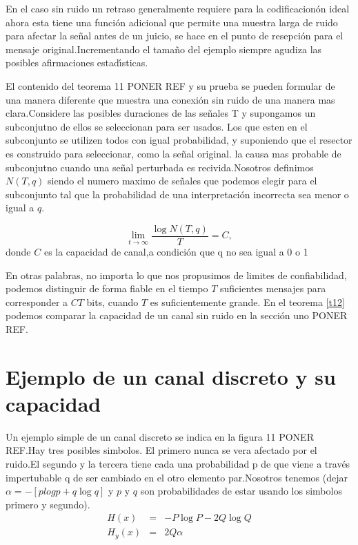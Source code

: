 En el caso sin ruido un retraso generalmente requiere para la
codificacion\'on ideal ahora esta tiene una funci\'on adicional que
permite una muestra larga de ruido para afectar la se\~{n}al antes de
un juicio, se hace en el punto de resepci\'on para el mensaje
original.Incrementando el tama\~{n}o del ejemplo siempre agudiza las
posibles afirmaciones estad\'{\i}sticas.

El contenido del teorema 11 PONER REF y su prueba se pueden formular
de una manera diferente que muestra una conexi\'on sin ruido de una
manera mas clara.Considere las posibles duraciones de las se\~{n}ales
T y supongamos un subconjutno de ellos se seleccionan para ser
usados. Los que esten en el subconjunto se utilizen todos con igual
probabilidad, y suponiendo que el resector es construido para
seleccionar, como la se\~{n}al original. la causa mas probable de
subconjutno cuando una se\~{n}al perturbada es recivida.Nosotros
definimos $N(T,q)$ siendo el numero maximo de se\~{n}ales que podemos
elegir para el subconjunto tal que la probabilidad de una
interpretaci\'{o}n incorrecta sea menor o igual a $q$.

\begin{theorem}
\begin{equation}
\lim_{t \to{}\infty}\frac{\log{N}(T,q)}{T} = C,
\end{equation}
donde $C$ es la capacidad de canal,a condici\'on que q no sea igual a
0 o 1
\label{t12}
\end{theorem}

En otras palabras, no importa lo que nos propusimos de limites de
confiabilidad, podemos distinguir de forma fiable en el tiempo $T$
suficientes mensajes para corresponder a $CT$ bits, cuando $T$ es
suficientemente grande. En el teorema \ref{t12} podemos comparar la
capacidad de un canal sin ruido en la secci\'on uno PONER REF.

\section{Ejemplo de un canal discreto y su capacidad}

Un ejemplo simple de un canal discreto se indica en la figura 11 PONER
REF.Hay tres posibles simbolos. El primero nunca se vera afectado por
el ruido.El segundo y la tercera tiene cada una probabilidad p de que
viene a trav\'es impertubable q de ser cambiado en el otro elemento
par.Nosotros tenemos (dejar $\alpha = -[plogp + q\log{q}]$ y $p$ y $q$
son probabilidades de estar usando los simbolos primero y segundo).
\begin{equation}
\begin{array}{rcl}
H(x) &=& -P\log{P} - 2Q\log{Q} \\
H_y(x) &=& 2Q\alpha
\end{array}
\end{equation}

